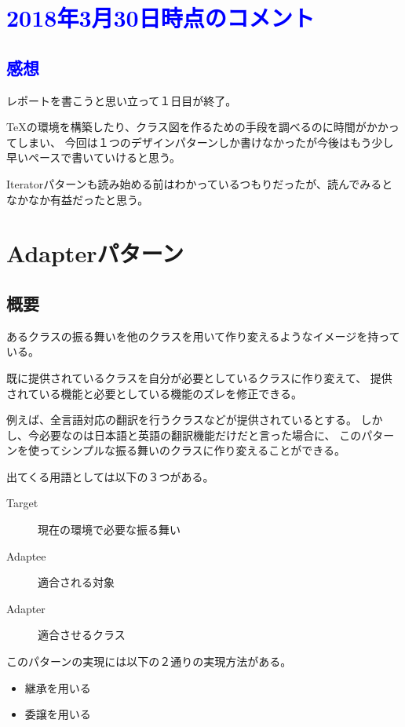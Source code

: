 \documentclass[11pt]{jsarticle}
\begin{document}
	\section*{\textcolor{blue}{2018年3月30日時点のコメント}}
		\subsection*{\textcolor{blue}{感想}}
			レポートを書こうと思い立って１日目が終了。
			
			\TeX の環境を構築したり、クラス図を作るための手段を調べるのに時間がかかってしまい、
			今回は１つのデザインパターンしか書けなかったが今後はもう少し早いペースで書いていけると思う。
			
			Iteratorパターンも読み始める前はわかっているつもりだったが、読んでみるとなかなか有益だったと思う。
			\clearpage
			
	\section{Adapterパターン}
		\subsection{概要}
			あるクラスの振る舞いを他のクラスを用いて作り変えるようなイメージを持っている。
			
			既に提供されているクラスを自分が必要としているクラスに作り変えて、
			提供されている機能と必要としている機能のズレを修正できる。
			
			例えば、全言語対応の翻訳を行うクラスなどが提供されているとする。
			しかし、今必要なのは日本語と英語の翻訳機能だけだと言った場合に、
			このパターンを使ってシンプルな振る舞いのクラスに作り変えることができる。
			
			出てくる用語としては以下の３つがある。
			
			\begin{description}
				\item[Target]現在の環境で必要な振る舞い
				\item[Adaptee]適合される対象
				\item[Adapter]適合させるクラス
			\end{description}

			
			このパターンの実現には以下の２通りの実現方法がある。
			\begin{itemize}
				\item{継承を用いる}
				\item{委譲を用いる}
			\end{itemize}
			
\end{document}

